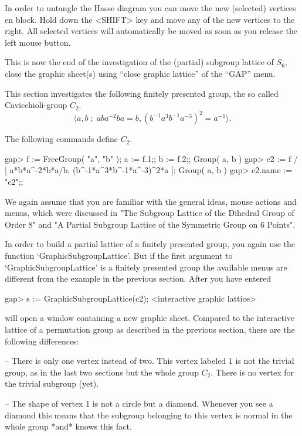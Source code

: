 In order  to untangle the Hasse diagram you  can  move the new (selected)
vertices  en block.  Hold down  the <SHIFT> key and   move any of the new
vertices to the right.  All selected vertices will automatically be moved
as soon as you release the left mouse button.

This is  now the  end  of the investigation   of  the (partial)  subgroup
lattice   of  $S_6$, close the    graphic  sheet(s) using  ``close graphic
lattice'' of the ``GAP'' menu.



This  section  investigates the  following  finitely presented group, the
so called Cavicchioli-group $C_2$.
$$
\langle a, b \;;\; aba^{-2}ba=b, (b^{-1}a^3b^{-1}a^{-3})^2=a^{-1}\rangle.
$$

The following {\GAP} commands define $C_2$.

\begintt
gap> f := FreeGroup( "a", "b" );  a := f.1;;  b := f.2;;
Group( a, b )
gap> c2 := f / [ a*b*a^-2*b*a/b, (b^-1*a^3*b^-1*a^-3)^2*a ];
Group( a, b )
gap> c2.name := "c2";; 
\endtt

We again assume that you are familiar with the general ideas, mouse actions
and menus, which were discussed in "The Subgroup Lattice of the Dihedral
Group of Order 8" and "A Partial Subgroup Lattice of the Symmetric Group on
6 Points".

In order  to build a  partial lattice of a  finitely presented group, you
again use the function  `GraphicSubgroup\-Lattice'.  But if the first  argument
to `GraphicSubgroupLattice' is a finitely presented group the available menus
are different  from the example in  the previous section.  After you have
entered

\begintt
gap> s := GraphicSubgroupLattice(c2);
<interactive graphic lattice> 
\endtt

{\XGAP} will open a window  containing a new  graphic sheet.  Compared to
the  interactive  lattice of  a permutation   group  as described  in the
previous section, there are the following differences:

-- There is only one  vertex instead of two.   This vertex labeled $1$ is
not the trivial  group, as in the last  two sections but  the whole group
$C_2$.  There is no vertex for the trivial subgroup (yet).

-- The shape of  vertex $1$ is not a  circle but a diamond.  Whenever you
see a diamond this  means that the subgroup  belonging to this vertex  is
normal in the whole group *and* {\GAP} knows this fact.

